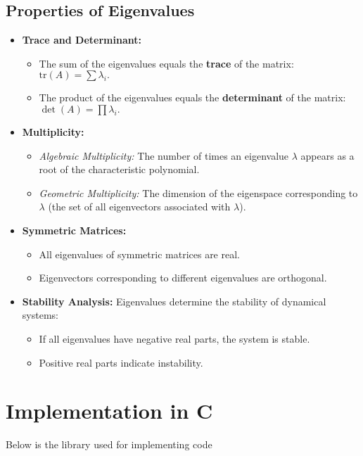 \documentclass[12pt]{article}
\begin{document}
\subsection{Properties of Eigenvalues}
\begin{itemize}
    \item \textbf{Trace and Determinant:}
    \begin{itemize}
        \item The sum of the eigenvalues equals the \textbf{trace} of the matrix: $\text{tr}(A) = \sum \lambda_i.$
        \item The product of the eigenvalues equals the \textbf{determinant} of the matrix: $\det(A) = \prod \lambda_i.$
    \end{itemize}
    
    \item \textbf{Multiplicity:}
    \begin{itemize}
        \item \textit{Algebraic Multiplicity:} The number of times an eigenvalue $\lambda$ appears as a root of the characteristic polynomial.
        \item \textit{Geometric Multiplicity:} The dimension of the eigenspace corresponding to $\lambda$ (the set of all eigenvectors associated with $\lambda$).
    \end{itemize}
    
    \item \textbf{Symmetric Matrices:}
    \begin{itemize}
        \item All eigenvalues of symmetric matrices are real.
        \item Eigenvectors corresponding to different eigenvalues are orthogonal.
    \end{itemize}
    
    \item \textbf{Stability Analysis:}
    Eigenvalues determine the stability of dynamical systems:
    \begin{itemize}
        \item If all eigenvalues have negative real parts, the system is stable.
        \item Positive real parts indicate instability.
    \end{itemize}
\end{itemize}

\section{Implementation in C}
Below is the library used for implementing code

\end{document}

